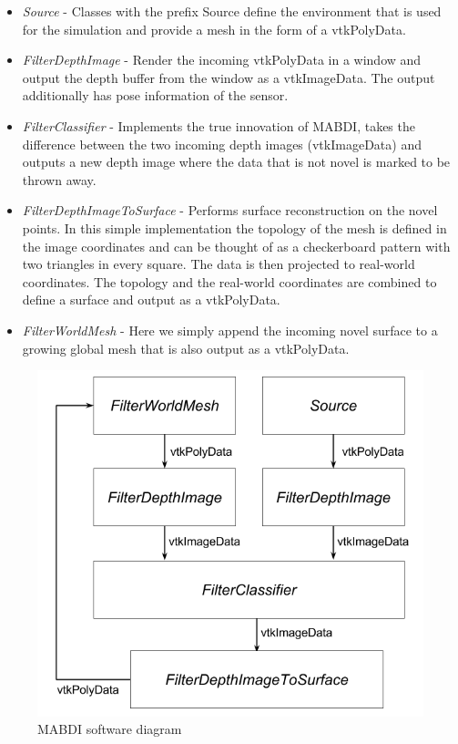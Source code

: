 \begin{itemize}
    \item  \textit{Source} - Classes with the prefix Source define the
    environment that is used for the simulation and provide a mesh in the form
    of a vtkPolyData.
    \item \textit{FilterDepthImage} - Render the incoming vtkPolyData in a
    window and output the depth buffer from the window as a vtkImageData. The
    output additionally has pose information of the sensor.
    \item \textit{FilterClassifier} - Implements the true innovation of MABDI,
    takes the difference between the two incoming depth images (vtkImageData)
    and outputs a new depth image where the data that is not novel is marked to
    be thrown away.
    \item \textit{FilterDepthImageToSurface} - Performs surface reconstruction
    on the novel points. In this simple implementation the topology of the mesh
    is defined in the image coordinates and can be thought of as a checkerboard
    pattern with two triangles in every square. The data is then projected to
    real-world coordinates. The topology and the real-world coordinates are
    combined to define a surface and output as a vtkPolyData.
    \item \textit{FilterWorldMesh} - Here we simply append the incoming novel
    surface to a growing global mesh that is also output as a vtkPolyData.
\end{itemize}

\begin{figure}[h]%
\centering
\includegraphics[width=.5\textwidth]{figures/diagram_software.png}
\caption{MABDI software diagram}
\label{fig:software}
\end{figure}
